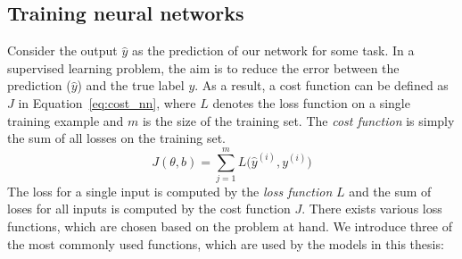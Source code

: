 \subsection{Training neural networks}
Consider the output $\hat { y } $ as the prediction of our network for some task. In a supervised learning problem, the aim is to reduce the error between the prediction ($\hat { y } $) and the true label $y$. As a result, a cost function can be defined as $J$ in Equation~\ref{eq:cost_nn}, where $L$ denotes the loss function on a single training example and $m$ is the size of the training set. The \emph{cost function} is simply the sum of all losses on the training set.
\begin{equation}
J(\theta,b)=\sum _{ j=1 }^{ m }{ L( } \hat { y }^{ (i) } ,y^{ (i) })
\label{eq:cost_nn}
\end{equation}
The loss for a single input is computed by the \emph{loss function} $L$ and the sum of loses for all inputs is computed by the cost function $J$. There exists various loss functions, which are chosen based on the problem at hand. We introduce three of the most commonly used functions, which are used by the models in this thesis: \\
